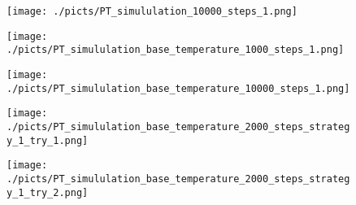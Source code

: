 \begin{frame}[plain]

	\begin{center}
		\begin{figure}\texttt{[image: ./picts/PT\_simululation\_10000\_steps\_1.png]}\end{figure}	
	\end{center}	
		
\end{frame}



\begin{frame}[plain]

	\begin{center}
		\begin{figure}\texttt{[image: ./picts/PT\_simululation\_base\_temperature\_1000\_steps\_1.png]}\end{figure}	
	\end{center}	
		
\end{frame}

\begin{frame}[plain]

	\begin{center}
		\begin{figure}\texttt{[image: ./picts/PT\_simululation\_base\_temperature\_10000\_steps\_1.png]}\end{figure}	
	\end{center}	
		
\end{frame}


\begin{frame}[plain]

	\begin{center}
		\begin{figure}\texttt{[image: ./picts/PT\_simululation\_base\_temperature\_2000\_steps\_strategy\_1\_try\_1.png]}\end{figure}	
	\end{center}	
		
\end{frame}

\begin{frame}[plain]

	\begin{center}
		\begin{figure}\texttt{[image: ./picts/PT\_simululation\_base\_temperature\_2000\_steps\_strategy\_1\_try\_2.png]}\end{figure}	
	\end{center}	
		
\end{frame}


